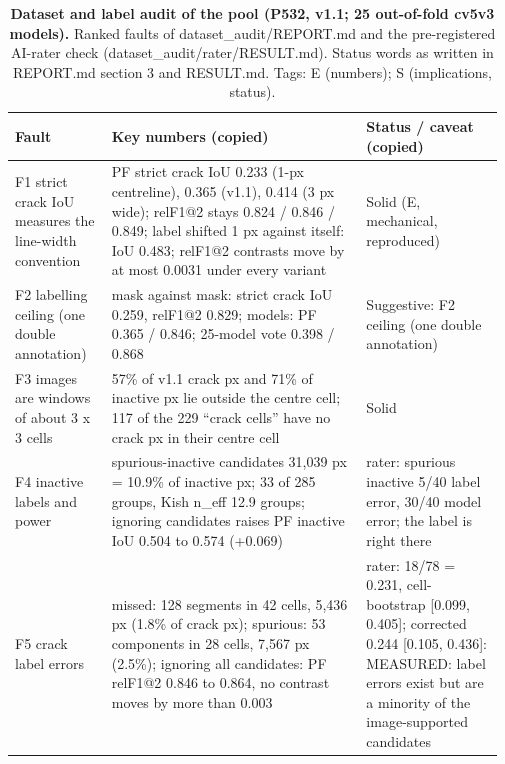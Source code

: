 \begin{table}[htbp]
\centering
\footnotesize
\setlength{\tabcolsep}{3pt}
\caption[Dataset and label audit of the pool (P532, v1.1; 25 out-of-fold cv5v3 models)]{\textbf{Dataset and label audit of the pool (P532, v1.1; 25 out-of-fold cv5v3 models).} Ranked faults of dataset\_audit/REPORT.md and the pre-registered AI-rater check (dataset\_audit/rater/RESULT.md). Status words as written in REPORT.md section 3 and RESULT.md. Tags: E (numbers); S (implications, status).}
\label{tab:T19a}
\begin{tabular}{@{}>{\raggedright\arraybackslash\hspace{0pt}}p{0.193\linewidth}>{\raggedright\arraybackslash\hspace{0pt}}p{0.503\linewidth}>{\raggedright\arraybackslash\hspace{0pt}}p{0.271\linewidth}@{}}
\toprule
\textbf{Fault} & \textbf{Key numbers (copied)} & \textbf{Status / caveat (copied)} \\
\midrule
F1 strict crack IoU measures the line-width convention & PF strict crack IoU 0.233 (1-px centreline), 0.365 (v1.1), 0.414 (3 px wide); relF1@2 stays 0.824 / 0.846 / 0.849; label shifted 1 px against itself: IoU 0.483; relF1@2 contrasts move by at most 0.0031 under every variant & Solid (E, mechanical, reproduced) \\
F2 labelling ceiling (one double annotation) & mask against mask: strict crack IoU 0.259, relF1@2 0.829; models: PF 0.365 / 0.846; 25-model vote 0.398 / 0.868 & Suggestive: F2 ceiling (one double annotation) \\
F3 images are windows of about 3 x 3 cells & 57\% of v1.1 crack px and 71\% of inactive px lie outside the centre cell; 117 of the 229 ``crack cells'' have no crack px in their centre cell & Solid \\
F4 inactive labels and power & spurious-inactive candidates 31,039 px = 10.9\% of inactive px; 33 of 285 groups, Kish n\_\allowbreak{}eff 12.9 groups; ignoring candidates raises PF inactive IoU 0.504 to 0.574 (+0.069) & rater: spurious inactive 5/\allowbreak{}40 label error, 30/\allowbreak{}40 model error; the label is right there \\
F5 crack label errors & missed: 128 segments in 42 cells, 5,436 px (1.8\% of crack px); spurious: 53 components in 28 cells, 7,567 px (2.5\%); ignoring all candidates: PF relF1@2 0.846 to 0.864, no contrast moves by more than 0.003 & rater: 18/\allowbreak{}78 = 0.231, cell-bootstrap [0.099, 0.405]; corrected 0.244 [0.105, 0.436]: MEASURED: label errors exist but are a minority of the image-supported candidates \\

\end{tabular}
\end{table}
